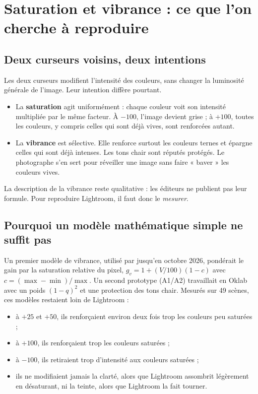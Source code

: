 \chapter{Saturation et vibrance : ce que l'on cherche à reproduire}

\section{Deux curseurs voisins, deux intentions}
Les deux curseurs modifient l'intensité des couleurs, sans changer la
luminosité générale de l'image. Leur intention diffère pourtant.

\begin{itemize}
\item La \textbf{saturation} agit uniformément : chaque couleur voit son
intensité multipliée par le même facteur. À $-100$, l'image devient grise ; à
$+100$, toutes les couleurs, y compris celles qui sont déjà vives, sont
renforcées autant.
\item La \textbf{vibrance} est sélective. Elle renforce surtout les couleurs
ternes et épargne celles qui sont déjà intenses. Les tons chair sont réputés
protégés. Le photographe s'en sert pour réveiller une image sans faire
« baver » les couleurs vives.
\end{itemize}

La description de la vibrance reste qualitative : les éditeurs ne publient pas
leur formule. Pour reproduire Lightroom, il faut donc le \emph{mesurer}.

\section{Pourquoi un modèle mathématique simple ne suffit pas}
Un premier modèle de vibrance, utilisé par \IPR{} jusqu'en octobre 2026,
pondérait le gain par la saturation relative du pixel,
$g_v=1+(V/100)(1-c)$ avec $c=(\max-\min)/\max$. Un second prototype (A1/A2)
travaillait en Oklab avec un poids $(1-q)^2$ et une protection des tons chair.
Mesurés sur 49 scènes, ces modèles restaient loin de Lightroom :

\begin{itemize}
\item à $+25$ et $+50$, ils renforçaient environ deux fois trop les couleurs
peu saturées ;
\item à $+100$, ils renforçaient trop les couleurs saturées ;
\item à $-100$, ils retiraient trop d'intensité aux couleurs saturées ;
\item ils ne modifiaient jamais la clarté, alors que Lightroom assombrit
légèrement en désaturant, ni la teinte, alors que Lightroom la fait tourner.
\end{itemize}

